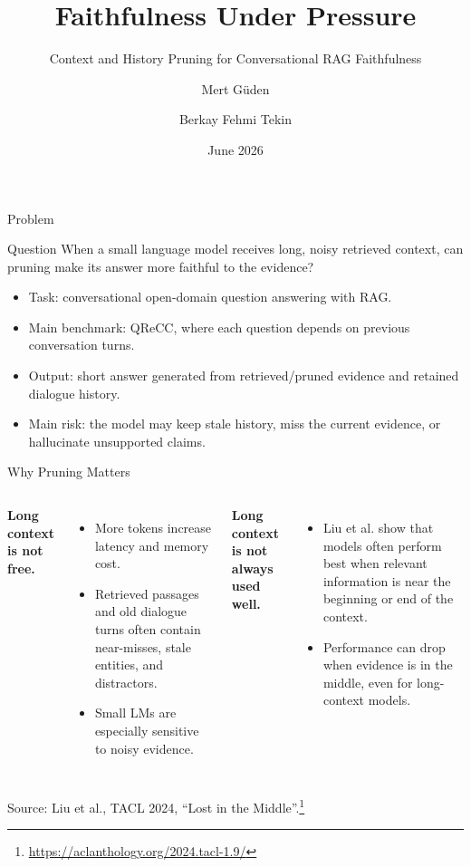 \documentclass[aspectratio=169,11pt]{beamer}
\title[Faithfulness Under Pressure]{Faithfulness Under Pressure}
\subtitle{Context and History Pruning for Conversational RAG Faithfulness}
\author[M. G\"uden, B. F. Tekin]{Mert G\"uden \and Berkay Fehmi Tekin}
\institute[CENG 467]{CENG 467 -- Natural Language Understanding and Generation}
\date{June 2026}
\begin{document}
\begin{frame}
  \titlepage
\end{frame}

\begin{frame}{Problem}
  \begin{block}{Question}
    When a small language model receives long, noisy retrieved context, can pruning make its answer more faithful to the evidence?
  \end{block}

  \vspace{0.5em}
  \begin{itemize}
    \item Task: conversational open-domain question answering with RAG.
    \item Main benchmark: QReCC, where each question depends on previous conversation turns.
    \item Output: short answer generated from retrieved/pruned evidence and retained dialogue history.
    \item Main risk: the model may keep stale history, miss the current evidence, or hallucinate unsupported claims.
  \end{itemize}
\end{frame}

\begin{frame}{Why Pruning Matters}
  \begin{columns}[T,onlytextwidth]
    \textbf{Long context is not free.}
    \begin{itemize}
      \item More tokens increase latency and memory cost.
      \item Retrieved passages and old dialogue turns often contain near-misses, stale entities, and distractors.
      \item Small LMs are especially sensitive to noisy evidence.
    \end{itemize}

    \textbf{Long context is not always used well.}
    \begin{itemize}
      \item Liu et al. show that models often perform best when relevant information is near the beginning or end of the context.
      \item Performance can drop when evidence is in the middle, even for long-context models.
    \end{itemize}
  \end{columns}

  \vspace{0.5em}
  \footnotesize Source: Liu et al., TACL 2024, ``Lost in the Middle''.\footnote{\url{https://aclanthology.org/2024.tacl-1.9/}}
\end{frame}
\end{document}
